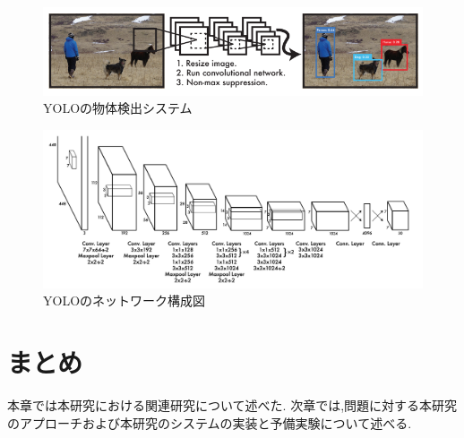 \begin{figure}[htbp]
  \begin{center}
    \includegraphics[width=\textwidth]{figs/Yolo_Detection_system.png}
    \caption{YOLOの物体検出システム\cite{yolov3}}
    \label{fig:yolo_system}
  \end{center}
\end{figure}

\begin{figure}[htbp]
  \begin{center}
    \includegraphics[width=\textwidth]{figs/yolo_architecture.png}
    \caption{YOLOのネットワーク構成図\cite{yolov3}}
    \label{fig:yolo_network}
  \end{center}
 \end{figure}
 
 \section{まとめ}
 本章では本研究における関連研究について述べた.
 次章では,問題に対する本研究のアプローチおよび本研究のシステムの実装と予備実験について述べる.